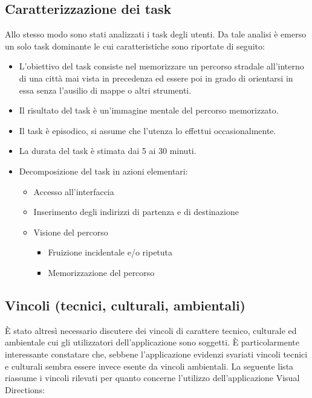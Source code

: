 \documentclass[12pt,a4paper,openright, notitlepage]{report}
\begin{document}
\subsection{Caratterizzazione dei task}

Allo stesso modo sono stati analizzati i task degli utenti. Da tale analisi è emerso un solo task dominante le cui caratteristiche sono riportate di seguito:

\begin{itemize}
	\item L’obiettivo del task consiste nel memorizzare un percorso stradale all’interno di una città  mai vista in precedenza ed essere poi in grado di orientarsi in essa senza l’ausilio di mappe o altri strumenti.
	\item Il risultato del task è un’immagine mentale del percorso memorizzato.
	\item Il task è episodico, si assume che l’utenza lo effettui occasionalmente.
	\item La durata del task è stimata dai 5 ai 30 minuti.
	\item Decomposizione del task in azioni elementari:
		\begin{itemize}		
			\item Accesso all’interfaccia
			\item Inserimento degli indirizzi di partenza e di destinazione
			\item Visione del percorso
			\begin{itemize}
				\item Fruizione incidentale e/o ripetuta
				\item Memorizzazione del percorso
			\end{itemize}
		\end{itemize}
\end{itemize}

\subsection{Vincoli (tecnici, culturali, ambientali)}

È stato altresì necessario discutere dei vincoli di carattere tecnico, culturale ed ambientale cui gli utilizzatori dell’applicazione sono soggetti. È particolarmente interessante constatare che, sebbene l’applicazione evidenzi svariati vincoli tecnici e culturali sembra essere invece esente da vincoli ambientali. La seguente lista riassume i vincoli rilevati per quanto concerne l’utilizzo dell’applicazione Visual Directions:
\end{document}
